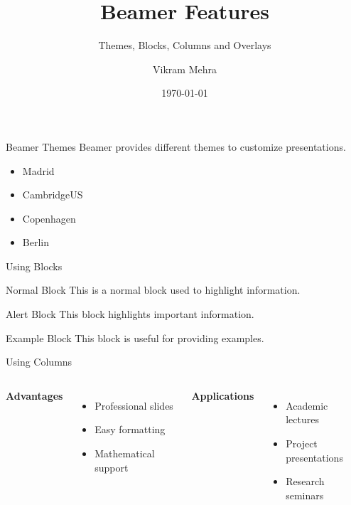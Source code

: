 \documentclass{beamer}
\title{Beamer Features}
\subtitle{Themes, Blocks, Columns and Overlays}
\author{Vikram Mehra}
\institute{Technical Writing Lab 2026}
\date{\today}
\begin{document}
\begin{frame}
    \titlepage
\end{frame}

\begin{frame}{Beamer Themes}
    Beamer provides different themes to customize presentations.

    \begin{itemize}
        \item Madrid
        \item CambridgeUS
        \item Copenhagen
        \item Berlin
    \end{itemize}
\end{frame}

\begin{frame}{Using Blocks}
    \begin{block}{Normal Block}
        This is a normal block used to highlight information.
    \end{block}

    \begin{alertblock}{Alert Block}
        This block highlights important information.
    \end{alertblock}

    \begin{exampleblock}{Example Block}
        This block is useful for providing examples.
    \end{exampleblock}
\end{frame}

\begin{frame}{Using Columns}
    \begin{columns}
        \textbf{Advantages}
        \begin{itemize}
            \item Professional slides
            \item Easy formatting
            \item Mathematical support
        \end{itemize}

        \textbf{Applications}
        \begin{itemize}
            \item Academic lectures
            \item Project presentations
            \item Research seminars
        \end{itemize}
    \end{columns}
\end{frame}
\end{document}
